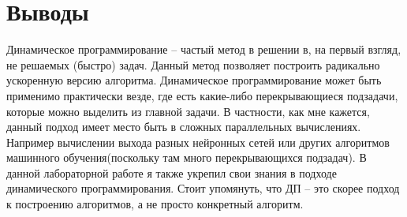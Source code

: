\section{Выводы}

Динамическое программирование -- частый метод в решении в, на первый взгляд, не решаемых (быстро) задач.
Данный метод позволяет построить радикально ускоренную версию алгоритма.
Динамическое программирование может быть применимо практически везде, где есть какие-либо перекрывающиеся подзадачи, которые можно выделить из главной задачи.
В частности, как мне кажется, данный подход имеет место быть в сложных параллельных вычислениях. Например вычислении выхода разных нейронных сетей или других алгоритмов машинного обучения(поскольку там много перекрывающихся подзадач).
В данной лабораторной работе я также укрепил свои знания в подходе динамического программирования.
Стоит упомянуть, что ДП -- это скорее подход к построению алгоритмов, а не просто конкретный алгоритм.
\pagebreak
